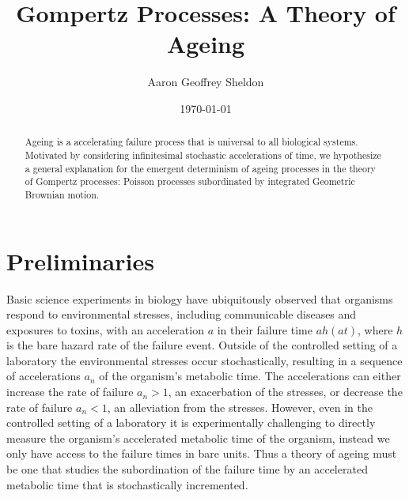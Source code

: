 \documentclass{article}
\theoremstyle{definition}\newtheorem{definition}{Definition}
\begin{document}
  \title{Gompertz Processes: A Theory of Ageing}
  \author{Aaron Geoffrey Sheldon}
  \date{\today}
  \maketitle

  \begin{abstract}
    Ageing is a accelerating failure process that is universal to all biological systems.
    Motivated by considering infinitesimal stochastic accelerations of time, we hypothesize
    a general explanation for the emergent determinism of ageing processes in the theory of
    Gompertz processes: Poisson processes subordinated by integrated Geometric Brownian
    motion.
  \end{abstract}

  \section{Preliminaries}
  Basic science experiments in biology have ubiquitously observed that organisms respond to
  environmental stresses, including communicable diseases and exposures to toxins, with an
  acceleration $a$ in their failure time $a h\left(a t\right)$, where $h$ is the bare hazard
  rate of the failure event. Outside of the controlled setting of a laboratory the
  environmental stresses occur stochastically, resulting in a sequence of accelerations
  $a_n$ of the organism's metabolic time. The accelerations can either increase the rate of
  failure $a_n > 1$, an exacerbation of the stresses, or decrease the rate of failure
  $a_n < 1$, an alleviation from the stresses. However, even in the controlled setting of a
  laboratory it is experimentally challenging to directly measure the organism's accelerated
  metabolic time of the organism, instead we only have access to the failure times in bare
  units. Thus a theory of ageing must be one that studies the subordination of the failure
  time by an accelerated metabolic time that is stochastically incremented.
\end{document}
